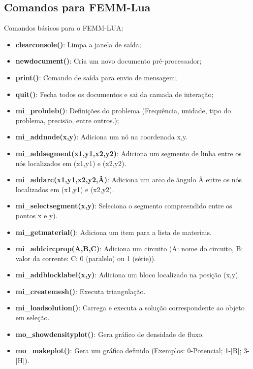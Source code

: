 \subsection{Comandos para FEMM-Lua}
Comandos básicos para o FEMM-LUA:
\begin{itemize}
  \item \textbf{clearconsole()}: Limpa a janela de saída;
  \item \textbf{newdocument()}: Cria um novo documento pré-processador;
  \item \textbf{print()}: Comando de saída para envio de mensagem;
  \item \textbf{quit()}: Fecha todos os documentos e sai da camada de interação;
  \item \textbf{mi\_probdeb()}: Definições do problema (Frequência, unidade, tipo do problema, precisão, entre outros.);
\end{itemize}
%
\begin{itemize}
  \item \textbf{mi\_addnode(x,y)}: Adiciona um nó na coordenada x,y.
  \item \textbf{mi\_addsegment(x1,y1,x2,y2)}: Adiciona um segmento de linha entre os nós localizados em (x1,y1) e (x2,y2).
  \item \textbf{mi\_addarc(x1,y1,x2,y2,Â)}: Adiciona um arco de ângulo Â entre os nós localizados em (x1,y1) e (x2,y2).
  \item \textbf{mi\_selectsegment(x,y)}: Seleciona o segmento compreendido entre os pontos x e y).
  \item \textbf{mi\_getmaterial()}: Adiciona um item para a lista de materiais.
  \item \textbf{mi\_addcircprop(A,B,C)}: Adiciona um circuito (A: nome do circuito, B: valor da corrente: C: 0 (paralelo) ou 1 (série)).
  \item \textbf{mi\_addblocklabel(x,y)}: Adiciona um bloco localizado na posição (x,y).
\end{itemize}
%
\begin{itemize}
  \item \textbf{mi\_createmesh()}: Executa triangulação.
  \item \textbf{mi\_loadsolution()}: Carrega e executa a solução correspondente ao objeto em seleção.
	\item \textbf{mo\_showdensityplot()}: Gera gráfico de densidade de fluxo.
  \item \textbf{mo\_makeplot()}: Gera um gráfico definido (Exemplos: 0-Potencial; 1-|B|; 3-|H|).
\end{itemize}

